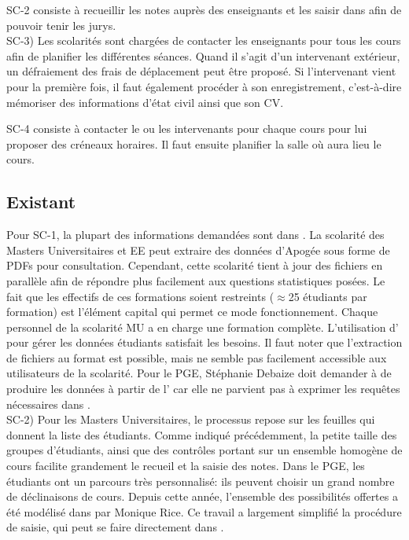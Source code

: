 \documentclass{book}
\begin{document}
SC-2 consiste à recueillir les notes auprès des enseignants et les saisir
dans  afin de pouvoir tenir les jurys.\\


SC-3) Les scolarités sont chargées de contacter les enseignants pour tous
les cours afin de planifier les différentes séances. Quand il s'agit d'un 
intervenant extérieur, un défraiement des frais de déplacement peut être
proposé. Si l'intervenant vient pour la première fois, il faut également 
procéder à son enregistrement, c'est-à-dire mémoriser des informations 
d'état civil ainsi que son CV.

SC-4 consiste à contacter le ou les intervenants pour chaque cours pour
lui proposer des créneaux horaires. Il faut ensuite planifier la salle
où aura lieu le cours.


\subsection{Existant}

Pour SC-1, la plupart des  informations demandées sont dans .  La
scolarité des  Masters Universitaires et  EE peut extraire des  données d'Apogée
sous forme  de PDFs pour consultation.  Cependant, cette scolarité tient  à jour
des fichiers   en parallèle  afin de répondre plus  facilement aux
questions  statistiques posées.  Le fait  que  les effectifs  de ces  formations
soient restreints  ($\approx$25 étudiants  par formation) est  l'élément capital
qui permet  ce mode  fonctionnement. Chaque  personnel de la  scolarité MU  a en
charge  une formation  complète. L'utilisation  d' pour  gérer les
données  étudiants satisfait  les besoins.   Il faut  noter que  l'extraction de
fichiers au  format  est  possible, mais ne semble  pas facilement
accessible aux utilisateurs de la scolarité.
%
Pour le PGE, Stéphanie Debaize doit demander à \CK de produire les
données à partir de l' car elle ne parvient pas à
exprimer les requêtes nécessaires dans .\\

SC-2) Pour les Masters Universitaires, le processus repose sur les
feuilles  qui donnent la liste des étudiants. Comme
indiqué précédemment, la petite taille des groupes d'étudiants,
ainsi que des contrôles portant sur un ensemble homogène de cours
facilite grandement le recueil et la saisie des notes.
Dans le PGE, les étudiants ont un parcours très personnalisé: ils
peuvent choisir un grand nombre de déclinaisons de cours. Depuis 
cette année, l'ensemble des possibilités offertes a été modélisé
dans  par Monique Rice. Ce travail a largement
simplifié la procédure de saisie, qui peut se faire directement
dans .\\
\end{document}
